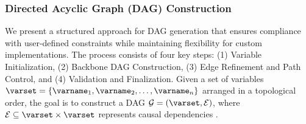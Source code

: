\documentclass{article}
\begin{document}
        \subsubsection{Directed Acyclic Graph (DAG) Construction}
            We present a structured approach for DAG generation that ensures compliance with user-defined constraints while maintaining flexibility for custom implementations. 
            The process consists of four key steps: (1) Variable Initialization, (2) Backbone DAG Construction, (3) Edge Refinement and Path Control, and (4) Validation and Finalization. 
            Given a set of variables $ \varset = \{\varname_1, \varname_2, \dots, \varname_n\} $ arranged in a topological order, the goal is to construct a DAG $ \mathcal{G} = (\varset, \mathcal{E}) $, where $ \mathcal{E} \subseteq \varset \times \varset $ represents causal dependencies \citep{pearl}. 
            
\end{document}
